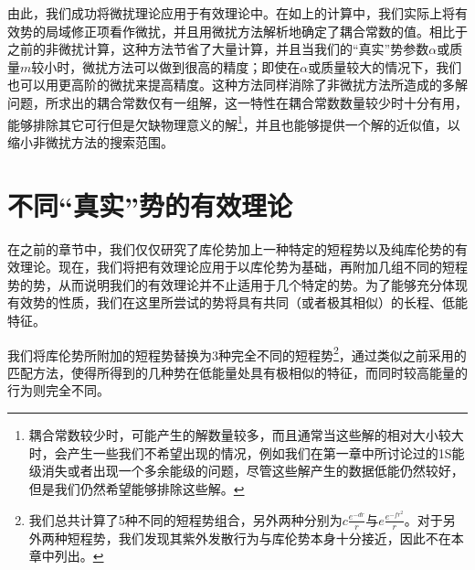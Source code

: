 \documentclass[cs4size,titlepage,twoside]{ctexart}
\begin{document}
由此，我们成功将微扰理论应用于有效理论中。在如上的计算中，我们实际上将有效势的局域修正项看作微扰，并且用微扰方法解析地确定了耦合常数的值。相比于之前的非微扰计算，这种方法节省了大量计算，并且当我们的“真实”势参数$\alpha$或质量$m$较小时，微扰方法可以做到很高的精度；即使在$\alpha$或质量较大的情况下，我们也可以用更高阶的微扰来提高精度。这种方法同样消除了非微扰方法所造成的多解问题，所求出的耦合常数仅有一组解，这一特性在耦合常数数量较少时十分有用，能够排除其它可行但是欠缺物理意义的解\footnote{耦合常数较少时，可能产生的解数量较多，而且通常当这些解的相对大小较大时，会产生一些我们不希望出现的情况，例如我们在第一章中所讨论过的1S能级消失或者出现一个多余能级的问题，尽管这些解产生的数据低能仍然较好，但是我们仍然希望能够排除这些解。}，并且也能够提供一个解的近似值，以缩小非微扰方法的搜索范围。
\cleardoublepage
\section{不同“真实”势的有效理论}
在之前的章节中，我们仅仅研究了库伦势加上一种特定的短程势以及纯库伦势的有效理论。现在，我们将把有效理论应用于以库伦势为基础，再附加几组不同的短程势的势，从而说明我们的有效理论并不止适用于几个特定的势。为了能够充分体现有效势的性质，我们在这里所尝试的势将具有共同（或者极其相似）的长程、低能特征。

我们将库伦势所附加的短程势替换为3种完全不同的短程势\footnote{我们总共计算了5种不同的短程势组合，另外两种分别为$c \frac{e^{-dr}}{r}$与$e \frac{e^{-fr^2}}{r}$。对于另外两种短程势，我们发现其紫外发散行为与库伦势本身十分接近，因此不在本章中列出。}，通过类似之前采用的匹配方法，使得所得到的几种势在低能量处具有极相似的特征，而同时较高能量的行为则完全不同。
\end{document}
